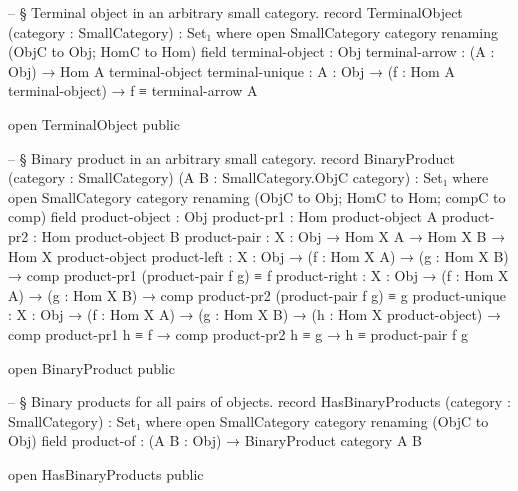 \documentclass[11pt]{article}
\begin{document}
\begin{code}
-- § Terminal object in an arbitrary small category.
record TerminalObject (category : SmallCategory) : Set₁ where
  open SmallCategory category renaming (ObjC to Obj; HomC to Hom)
  field
    terminal-object : Obj
    terminal-arrow  : (A : Obj) → Hom A terminal-object
    terminal-unique : {A : Obj} →
                      (f : Hom A terminal-object) → f ≡ terminal-arrow A

open TerminalObject public

-- § Binary product in an arbitrary small category.
record BinaryProduct
  (category : SmallCategory)
  (A B : SmallCategory.ObjC category) : Set₁ where
  open SmallCategory category renaming (ObjC to Obj; HomC to Hom; compC to comp)
  field
    product-object : Obj
    product-pr1    : Hom product-object A
    product-pr2    : Hom product-object B
    product-pair   : {X : Obj} →
                     Hom X A → Hom X B → Hom X product-object
    product-left   : {X : Obj} →
                     (f : Hom X A) →
                     (g : Hom X B) →
                     comp product-pr1 (product-pair f g) ≡ f
    product-right  : {X : Obj} →
                     (f : Hom X A) →
                     (g : Hom X B) →
                     comp product-pr2 (product-pair f g) ≡ g
    product-unique : {X : Obj} →
                     (f : Hom X A) →
                     (g : Hom X B) →
                     (h : Hom X product-object) →
                     comp product-pr1 h ≡ f →
                     comp product-pr2 h ≡ g →
                     h ≡ product-pair f g

open BinaryProduct public

-- § Binary products for all pairs of objects.
record HasBinaryProducts (category : SmallCategory) : Set₁ where
  open SmallCategory category renaming (ObjC to Obj)
  field
    product-of : (A B : Obj) → BinaryProduct category A B

open HasBinaryProducts public


\end{code}
\end{document}
